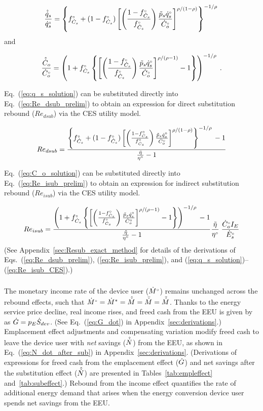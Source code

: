 \documentclass[12pt]{article}\usepackage[]{graphicx}\usepackage[]{xcolor}
\begin{document}
\begin{equation} \label{eq:q_s_solution}
  \frac{\rasub{q}_s}{\rbempl{q}_s} = \qssolution{}
\end{equation}
%
and

\begin{equation} \label{eq:C_o_solution}
  \frac{\rasub{C}_o}{\rbempl{C}_o} = \Cosolution{} \; .
\end{equation}

Eq.~(\ref{eq:q_s_solution}) can be substituted directly
into Eq.~(\ref{eq:Re_dsub_prelim})
to obtain an expression for direct substitution rebound ($Re_{dsub}$)
via the CES utility model.

\begin{equation} \label{eq:Re_dsub_CES}
  Re_{dsub} = \RedsubCES{}
\end{equation}

Eq.~(\ref{eq:C_o_solution}) can be substituted directly
into Eq.~(\ref{eq:Re_isub_prelim})
to obtain an expression for indirect substitution rebound ($Re_{isub}$)
via the CES utility model.

\begin{equation} \label{eq:Re_isub_CES}
  Re_{isub} = \ReisubCES{}
\end{equation}
%
(See Appendix~\ref{sec:Resub_exact_method} for details
of the derivations of Eqs.~(\ref{eq:Re_dsub_prelim}), 
(\ref{eq:Re_isub_prelim}), and 
(\ref{eq:q_s_solution})--(\ref{eq:Re_isub_CES}).)


\subsubsection{\Inceffect}
\label{sec:inc_effect_main_paper}

The monetary income rate of the device user ($\rbempl{M}$)
remains unchanged across the rebound effects, 
such that
$\rbempl{M} = \raempl{M} = \rasub{M} = \rainc{M} = \ramacro{M}$.
Thanks to the energy service price decline, real income rises, 
and freed cash from the EEU is given by 
as $\rate{G} = p_E \Sdot$.
(See Eq.~(\ref{eq:G_dot}) in Appendix~\ref{sec:derivations}.)
Emplacement effect adjustments and compensating variation
modify freed cash to leave the device user with
\emph{net} savings ($\rasub{N}$) from the EEU,
as shown in Eq.~(\ref{eq:N_dot_after_sub}) in Appendix~\ref{sec:derivations}.
(Derivations of expressions for freed cash from the 
emplacement effect ($\rate{G}$)
and net savings after the substitution effect ($\rasub{N}$)
are presented in Tables~\ref{tab:empleffect} and~\ref{tab:subeffect}.)
Rebound from the income effect quantifies the rate of additional energy demand 
that arises when the energy conversion device user spends net
savings from the EEU.
\end{document}
